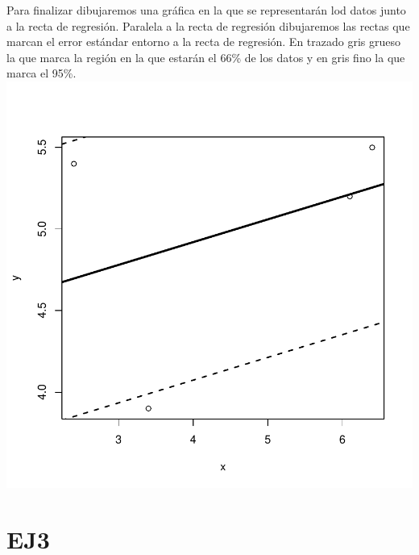 \documentclass [a4paper] {article}
\begin{document}
Para finalizar dibujaremos una gráfica en la que se representarán lod datos junto a la recta de regresión.
Paralela a la recta de regresión dibujaremos las rectas que marcan el error estándar entorno a la recta de regresión.
En trazado gris grueso la que marca la región en la que estarán el 66\% de los datos y en gris fino la que marca el 95\%.
\includegraphics{entrega2-plot_regresion2}


\section{EJ3}
\end{document}
